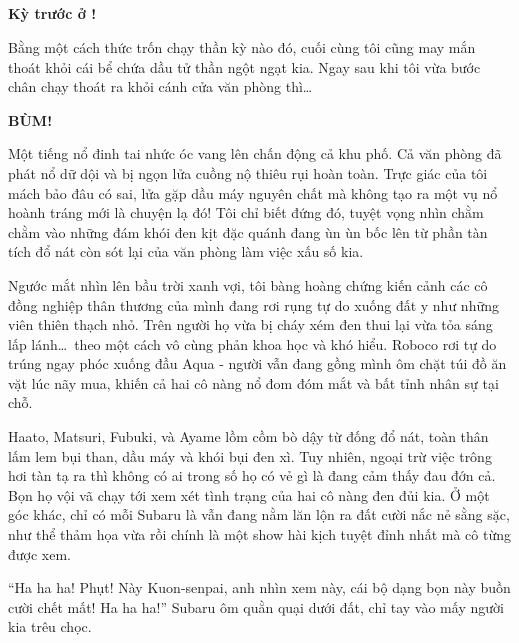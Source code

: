\documentclass[../main.tex]{subfiles}
\begin{document}
\subsection*{\label{ep-003.VIII}}

\begin{center}
  \textbf{Kỳ trước ở \hll !}
\end{center}


Bằng một cách thức trốn chạy thần kỳ nào đó, cuối cùng tôi cũng may mắn thoát khỏi cái bể chứa dầu tử thần ngột ngạt kia. Ngay sau khi tôi vừa bước chân chạy thoát ra khỏi cánh cửa văn phòng thì\dots

{\Large \textbf{BÙM!}}

Một tiếng nổ đinh tai nhức óc vang lên chấn động cả khu phố. Cả văn phòng đã phát nổ dữ dội và bị ngọn lửa cuồng nộ thiêu rụi hoàn toàn. Trực giác của tôi mách bảo đâu có sai, lửa gặp dầu máy nguyên chất mà không tạo ra một vụ nổ hoành tráng mới là chuyện lạ đó! Tôi chỉ biết đứng đó, tuyệt vọng nhìn chằm chằm vào những đám khói đen kịt đặc quánh đang ùn ùn bốc lên từ phần tàn tích đổ nát còn sót lại của văn phòng làm việc xấu số kia.

Ngước mắt nhìn lên bầu trời xanh vợi, tôi bàng hoàng chứng kiến cảnh các cô đồng nghiệp thân thương của mình đang rơi rụng tự do xuống đất y như những viên thiên thạch nhỏ. Trên người họ vừa bị cháy xém đen thui lại vừa tỏa sáng lấp lánh\dots\ theo một cách vô cùng phản khoa học và khó hiểu. Roboco rơi tự do trúng ngay phóc xuống đầu Aqua - người vẫn đang gồng mình ôm chặt túi đồ ăn vặt lúc nãy mua, khiến cả hai cô nàng nổ đom đóm mắt và bất tỉnh nhân sự tại chỗ.

Haato, Matsuri, Fubuki, và Ayame lồm cồm bò dậy từ đống đổ nát, toàn thân lấm lem bụi than, dầu máy và khói bụi đen xì. Tuy nhiên, ngoại trừ việc trông hơi tàn tạ ra thì không có ai trong số họ có vẻ gì là đang cảm thấy đau đớn cả. Bọn họ vội vã chạy tới xem xét tình trạng của hai cô nàng đen đủi kia. Ở một góc khác, chỉ có mỗi Subaru là vẫn đang nằm lăn lộn ra đất cười nắc nẻ sằng sặc, như thể thảm họa vừa rồi chính là một show hài kịch tuyệt đỉnh nhất mà cô từng được xem.

``Ha ha ha! Phụt! Này Kuon-senpai, anh nhìn xem này, cái bộ dạng bọn này buồn cười chết mất! Ha ha ha!'' Subaru ôm quằn quại dưới đất, chỉ tay vào mấy người kia trêu chọc.
\end{document}
